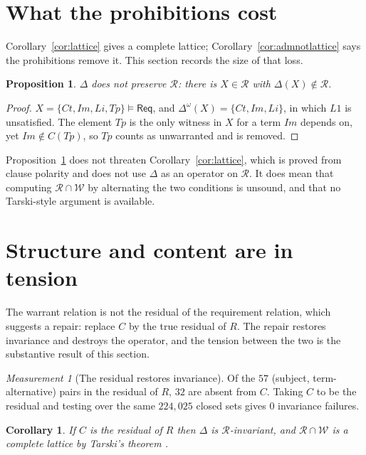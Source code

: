 \documentclass[11pt,reqno]{amsart}
\theoremstyle{plain}
\newtheorem{proposition}[theorem]{Proposition}
\newtheorem{corollary}[theorem]{Corollary}
\theoremstyle{definition}
\theoremstyle{remark}
\newtheorem{measurement}[theorem]{Measurement}
\newcommand{\Law}{\mathsf{Req}}
\begin{document}
\section{What the prohibitions cost}\label{sec:cost}

Corollary~\ref{cor:lattice} gives a complete lattice; Corollary~\ref{cor:admnotlattice}
says the prohibitions remove it. This section records the size of that loss.

\begin{proposition}\label{prop:noinvariance}
$\Delta$ does not preserve $\mathcal{R}$: there is $X \in \mathcal{R}$ with
$\Delta(X) \notin \mathcal{R}$.
\end{proposition}

\begin{proof}
$X = \{Ct,Im,Li,Tp\} \models \Law$, and $\Delta^{\omega}(X) = \{Ct,Im,Li\}$, in
which $L1$ is unsatisfied. The element $Tp$ is the only witness in $X$ for a term
$Im$ depends on, yet $Im \notin C(Tp)$, so $Tp$ counts as unwarranted and is
removed.
\end{proof}

Proposition~\ref{prop:noinvariance} does not threaten Corollary~\ref{cor:lattice},
which is proved from clause polarity and does not use $\Delta$ as an operator on
$\mathcal{R}$. It does mean that computing $\mathcal{R} \cap \mathcal{W}$ by
alternating the two conditions is unsound, and that no Tarski-style \cite{tarski1955} argument is
available.

\section{Structure and content are in tension}\label{sec:tradeoff}

The warrant relation is not the residual of the requirement relation, which suggests a repair: replace $C$ by the true
residual of $R$. The repair restores invariance and destroys the operator, and the
tension between the two is the substantive result of this section.

\begin{measurement}[The residual restores invariance]\label{meas:repair}
Of the $57$ (subject, term-alternative) pairs in the residual of $R$, $32$ are
absent from $C$. Taking $C$ to be the residual and testing over the same
$224{,}025$ closed sets gives $0$ invariance failures.
\end{measurement}

\begin{corollary}\label{cor:residual}
If $C$ is the residual of $R$ then $\Delta$ is $\mathcal{R}$-invariant, and
$\mathcal{R} \cap \mathcal{W}$ is a complete lattice by Tarski's theorem \cite{tarski1955}.
\end{corollary}
\end{document}
